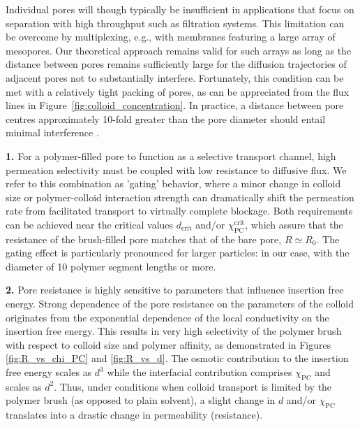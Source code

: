 \documentclass[12pt, a4paper]{article}
\begin{document}
Individual pores will though typically be insufficient in applications that focus on separation with high throughput such as filtration systems.
This limitation can be overcome by multiplexing, e.g., with membranes featuring a large array of mesopores.
Our theoretical approach remains valid for such arrays as long as the distance between pores remains sufficiently large for the diffusion trajectories of adjacent pores not to substantially interfere.
Fortunately, this condition can be met with a relatively tight packing of pores, as can be appreciated from the flux lines in Figure~\ref{fig:colloid_concentration}.
In practice, a distance between pore centres approximately 10-fold greater than the pore diameter should entail minimal interference \cite{Fabrikant1985}.

\bigskip


\textbf{1.}
For a polymer-filled pore to function as a selective transport channel, high permeation selectivity must be coupled with low resistance to diffusive flux.
We refer to this combination as 'gating' behavior, where a minor change in colloid size or polymer-colloid interaction strength can dramatically shift the permeation rate from facilitated transport to virtually complete blockage.
Both requirements can be achieved near the critical values $d_{\text{crit}}$ and/or $\chi_{\text{PC}}^{\text{crit}}$, which assure that the resistance of the brush-filled pore matches that of the bare pore, $R\simeq R_{0}$.
The gating effect is particularly pronounced for larger particles: in our case, with the diameter of 10 polymer segment lengths or more.

\textbf{2.}
Pore resistance is highly sensitive to parameters that influence insertion free energy.
Strong dependence of the pore resistance on the parameters of the colloid originates from the exponential dependence of the local conductivity on the insertion free energy.
This results in very high selectivity of the polymer brush with respect to colloid size and polymer affinity, as demonstrated in Figures \ref{fig:R_vs_chi_PC} and \ref{fig:R_vs_d}.
The osmotic contribution to the insertion free energy scales as $d^3$ while the interfacial contribution comprises $\chi_{\text{PC}}$ and scales as $d^2$.
Thus, under conditions when colloid transport is limited by the polymer brush (as opposed to plain solvent), a slight change in $d$ and/or $\chi_{\text{PC}}$ translates into a drastic change in permeability (resistance).
\end{document}
